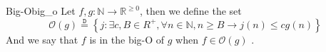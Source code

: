 \begin{definition}{Big-O}{big_o}
Let $ f, g: \mathbb{N} \to  \mathbb{R} ^{ \ge 0 }  $, then we define the set 
\[
    \mathcal{ O } \left( g \right) \stackrel{\mathtt{D}}{=}  \left\{ j: \exists c, B \in  R ^{ +  }, \forall n \in \mathbb{N} , n \ge B \rightarrow j\left( n \right) \le c g\left( n \right)    \right\} 
\]
And we say that $ f $ is in the big-O of $ g $ when $ f \in  \mathcal{ O } \left( g \right)  $ .
\end{definition}
